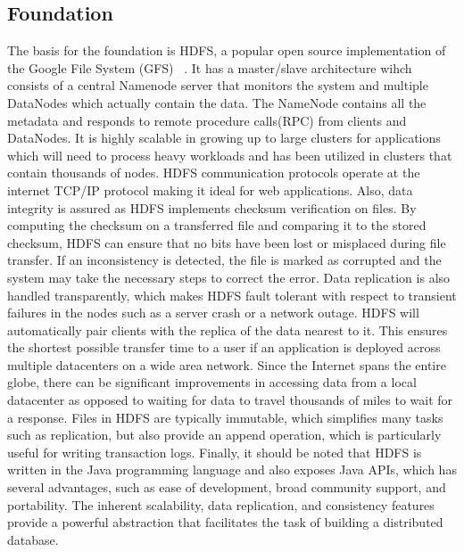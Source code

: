 \documentclass[10pt,final,journal]{IEEEtran}
\begin{document}
\subsection{Foundation}
The basis for the foundation is HDFS, a popular open source implementation of the Google File System (GFS) ~\cite{Ghemawat:2003:GFS:1165389.945450}. It has a master/slave architecture wihch consists of a central Namenode server that monitors the system and multiple DataNodes which actually contain the data. The NameNode contains all the metadata and responds to remote procedure calls(RPC) from clients and DataNodes. It is highly scalable in growing up to large clusters for applications which will need to process heavy workloads and has been utilized in clusters that contain thousands of nodes.  HDFS communication protocols operate at the internet TCP/IP protocol making it ideal for web applications. Also, data integrity is assured as HDFS implements checksum verification on files. By computing the checksum on a transferred file and comparing it to the stored checksum, HDFS can ensure that no bits have been lost or misplaced during file transfer. If an inconsistency is detected, the file is marked as corrupted and the system may take the necessary steps to correct the error.  Data replication is also handled transparently, which makes HDFS fault tolerant with respect to transient failures in the nodes such as a server crash or a network outage. HDFS will automatically pair clients with the replica of the data nearest to it. This ensures the shortest possible transfer time to a user if an application is deployed across multiple datacenters on a wide area network. Since the Internet spans the entire globe, there can be significant improvements in accessing data from a local datacenter as opposed to waiting for data to travel thousands of miles to wait for a response. Files in HDFS are typically immutable, which simplifies many tasks such as replication, but also provide an append operation, which is particularly useful for writing transaction logs. Finally, it should be noted that HDFS is written in the Java programming language and also exposes Java APIs, which has several advantages, such as ease of development, broad community support, and portability. The inherent scalability, data replication, and consistency features provide a powerful abstraction that facilitates the task of building a distributed database.
\end{document}

